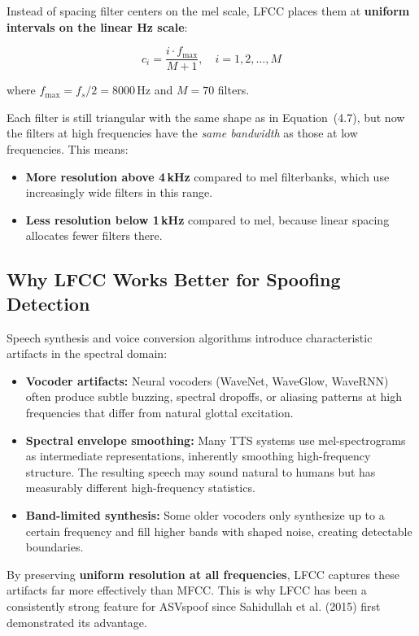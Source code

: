 \documentclass[12pt]{report}
\begin{document}
Instead of spacing filter centers on the mel scale, LFCC places them at \textbf{uniform
intervals on the linear Hz scale}:

\begin{equation}
    c_i = \frac{i \cdot f_\text{max}}{M + 1}, \quad i = 1, 2, \ldots, M
\end{equation}

where $f_\text{max} = f_s / 2 = 8000$\,Hz and $M = 70$ filters.

Each filter is still triangular with the same shape as in Equation~(4.7), but now the filters
at high frequencies have the \emph{same bandwidth} as those at low frequencies. This means:
\begin{itemize}[noitemsep]
    \item \textbf{More resolution above 4\,kHz} compared to mel filterbanks, which use
          increasingly wide filters in this range.
    \item \textbf{Less resolution below 1\,kHz} compared to mel, because linear spacing
          allocates fewer filters there.
\end{itemize}

\subsection{Why LFCC Works Better for Spoofing Detection}

Speech synthesis and voice conversion algorithms introduce characteristic artifacts in the
spectral domain:

\begin{itemize}
    \item \textbf{Vocoder artifacts:} Neural vocoders (WaveNet, WaveGlow, WaveRNN) often
          produce subtle buzzing, spectral dropoffs, or aliasing patterns at high frequencies
          that differ from natural glottal excitation.
    \item \textbf{Spectral envelope smoothing:} Many TTS systems use mel-spectrograms as
          intermediate representations, inherently smoothing high-frequency structure.
          The resulting speech may sound natural to humans but has measurably different
          high-frequency statistics.
    \item \textbf{Band-limited synthesis:} Some older vocoders only synthesize up to a certain
          frequency and fill higher bands with shaped noise, creating detectable boundaries.
\end{itemize}

By preserving \textbf{uniform resolution at all frequencies}, LFCC captures these artifacts
far more effectively than MFCC. This is why LFCC has been a consistently strong feature for
ASVspoof since Sahidullah et al. (2015) first demonstrated its advantage.
\end{document}

